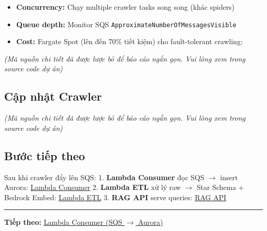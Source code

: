 \begin{itemize}
\tightlist
\item
  \textbf{Concurrency:} Chạy multiple crawler tasks song song (khác
  spiders)
\item
  \textbf{Queue depth:} Monitor SQS
  \texttt{ApproximateNumberOfMessagesVisible}
\item
  \textbf{Cost:} Fargate Spot (lên đến 70\% tiết kiệm) cho
  fault-tolerant crawling:
\end{itemize}

\emph{(Mã nguồn chi tiết đã được lược bỏ để báo cáo ngắn gọn. Vui lòng
xem trong source code dự án)}

\hypertarget{cux1eadp-nhux1eadt-crawler}{%
\subsection{Cập nhật Crawler}}

\emph{(Mã nguồn chi tiết đã được lược bỏ để báo cáo ngắn gọn. Vui lòng
xem trong source code dự án)}

\hypertarget{bux1b0ux1edbc-tiux1ebfp-theo}{%
\subsection{Bước tiếp theo}}

Sau khi crawler đẩy lên SQS: 1. \textbf{Lambda Consumer} đọc SQS
\(\rightarrow\) insert Aurora: \href{5.11-Lambda-Consumer/}{Lambda
Consumer} 2. \textbf{Lambda ETL} xử lý raw \(\rightarrow\) Star Schema +
Bedrock Embed: \href{5.12-Lambda-ETL/}{Lambda ETL} 3. \textbf{RAG API}
serve queries: \href{5.13-RAG-API/}{RAG API}

\begin{center}\rule{0.5\linewidth}{0.5pt}\end{center}

\textbf{Tiếp theo:} \href{5.11-Lambda-Consumer/}{Lambda Consumer (SQS
\(\rightarrow\) Aurora)}
